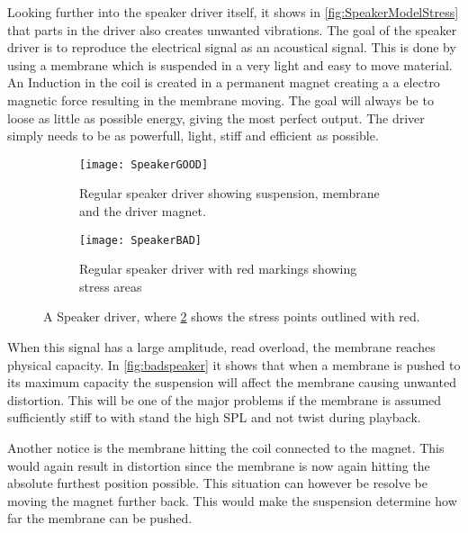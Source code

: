 Looking further into the speaker driver itself, it shows in \autoref{fig:SpeakerModelStress} that parts in the driver also creates unwanted vibrations. The goal of the speaker driver is to reproduce the electrical signal as an acoustical signal. This is done by using a membrane which is suspended in a very light and easy to move material. An Induction in the coil is created in a permanent magnet creating a a electro magnetic force resulting in the membrane moving. The goal will always be to loose as little as possible energy, giving the most perfect output. The driver simply needs to be as powerfull, light, stiff and efficient as possible.

\begin{figure}[H]
\centering
\begin{subfigure}[t]{0.47\textwidth}
\texttt{[image: SpeakerGOOD]}
	\caption{Regular speaker driver showing suspension, membrane and the driver magnet.}
	\label{fig:regularspeaker}
\end{subfigure}
\hspace{6mm} 
\begin{subfigure}[t]{0.47\textwidth}
\texttt{[image: SpeakerBAD]}
	\caption{Regular speaker driver with red markings showing stress areas}
	\label{fig:badspeaker}
\end{subfigure}
\caption{A Speaker driver, where \ref{fig:badspeaker} shows the stress points outlined with red.}
\label{fig:SpeakerModelStress}
\end{figure}

When this signal has a large amplitude, read overload, the membrane reaches physical capacity. In \autoref{fig:badspeaker} it shows that when a membrane is pushed to its maximum capacity the suspension will affect the membrane causing unwanted distortion. This will be one of the major problems if the membrane is assumed sufficiently stiff to with stand the high \gls{SPL} and not twist during playback. 

Another notice is the membrane hitting the coil connected to the magnet. This would again result in distortion since the membrane is now again hitting the absolute furthest position possible. This situation can however be resolve be moving the magnet further back. This would make the suspension determine how far the membrane can be pushed.


